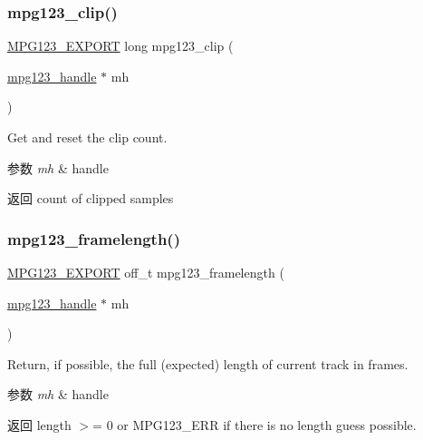 \subsubsection{\texorpdfstring{mpg123\+\_\+clip()}{mpg123\_clip()}}
{\footnotesize\ttfamily \hyperlink{mpg123_8h_a2ba98cfba3f760879df70e755b2a61cc}{M\+P\+G123\+\_\+\+E\+X\+P\+O\+RT} long mpg123\+\_\+clip (\begin{DoxyParamCaption}\item[{\hyperlink{group__mpg123__init_ga6728e2839a395f3a07d4514da659faca}{mpg123\+\_\+handle} $\ast$}]{mh }\end{DoxyParamCaption})}

Get and reset the clip count. 
\begin{DoxyParams}{参数}
{\em mh} & handle \\
\hline
\end{DoxyParams}
\begin{DoxyReturn}{返回}
count of clipped samples 
\end{DoxyReturn}
\mbox{\label{group__mpg123__status_gabf4a6c8f3b251acfa05fd7737a076370}} 
\subsubsection{\texorpdfstring{mpg123\+\_\+framelength()}{mpg123\_framelength()}}
{\footnotesize\ttfamily \hyperlink{mpg123_8h_a2ba98cfba3f760879df70e755b2a61cc}{M\+P\+G123\+\_\+\+E\+X\+P\+O\+RT} off\+\_\+t mpg123\+\_\+framelength (\begin{DoxyParamCaption}\item[{\hyperlink{group__mpg123__init_ga6728e2839a395f3a07d4514da659faca}{mpg123\+\_\+handle} $\ast$}]{mh }\end{DoxyParamCaption})}

Return, if possible, the full (expected) length of current track in frames. 
\begin{DoxyParams}{参数}
{\em mh} & handle \\
\hline
\end{DoxyParams}
\begin{DoxyReturn}{返回}
length $>$= 0 or M\+P\+G123\+\_\+\+E\+RR if there is no length guess possible. 
\end{DoxyReturn}
\mbox{\label{group__mpg123__status_gaf8d11409b86657b19069bbffb4c22fb7}} 
